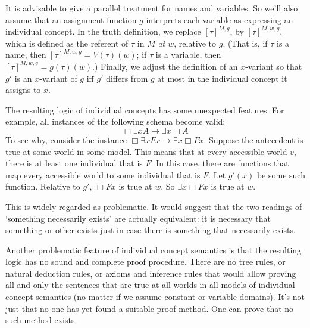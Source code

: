 It is advisable to give a parallel treatment for names and variables. So we'll
also assume that an assignment function $g$ interprets each variable as
expressing an individual concept. In the truth definition, we replace
$[\tau]^{M,g}$, by $[\tau]^{M,w,g}$, which is defined as the referent of $\tau$
in $M$ \emph{at $w$}, relative to $g$. (That is, if $\tau$ is a name, then
$[\tau]^{M,w,g} = V(\tau)(w)$; if $\tau$ is a variable, then
$[\tau]^{M,w,g} = g(\tau)(w)$.) Finally, we adjust the definition of an
$x$-variant so that $g'$ is an $x$-variant of $g$ iff $g'$ differs from $g$ at
most in the individual concept it assigns to $x$.

The resulting logic of individual concepts has some unexpected features. For
example, all instances of the following schema become valid:
\[
  \Box \exists x A \to \exists x \Box A
\]
To see why, consider the instance $\Box \exists x Fx \to \exists x \Box Fx$.
Suppose the antecedent is true at some world in some model. This means that at
every accessible world $v$, there is at least one individual that is $F$. In
this case, there are functions that map every accessible world to some
individual that is $F$. Let $g'(x)$ be some such function. Relative to $g'$,
$\Box Fx$ is true at $w$. So $\exists x \Box Fx$ is true at $w$.

This is widely regarded as problematic. It would suggest that the two readings
of `something necessarily exists' are actually equivalent: it is necessary that
something or other exists just in case there is something that necessarily
exists.


Another problematic feature of individual concept semantics is that the
resulting logic has no sound and complete proof procedure. There are no tree
rules, or natural deduction rules, or axioms and inference rules that would
allow proving all and only the sentences that are true at all worlds in all
models of individual concept semantics (no matter if we assume constant or
variable domains). It's not just that no-one has yet found a suitable proof
method. One can prove that no such method exists.

